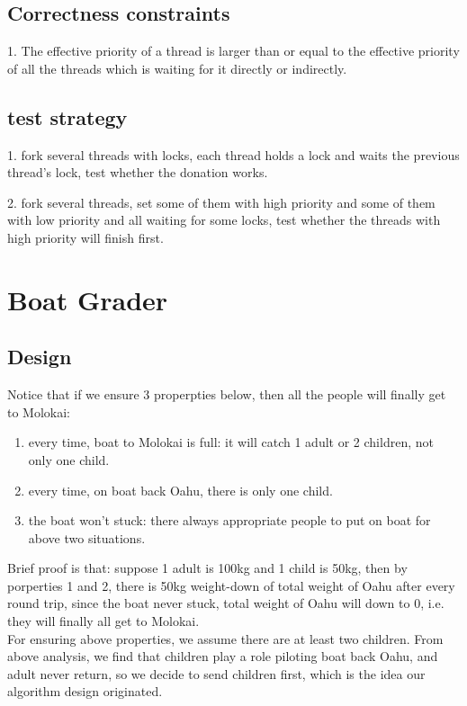 \documentclass[a4paper,10pt]{article}
\begin{document}
\subsection{Correctness constraints}

1. The effective priority of a thread is larger than or equal to the effective priority of all the threads which is waiting for it directly or indirectly.

\subsection{test strategy}

1. fork several threads with locks, each thread holds a lock and waits the previous thread's lock, test whether the donation works.

2. fork several threads, set some of them with high priority and some of them with low priority and all waiting for some locks, test whether the threads with high priority will finish first.


\section{Boat Grader}

\subsection {Design}
Notice that if we ensure 3 properpties below, then all the people will finally get to Molokai:
\begin{enumerate}
\item every time, boat to Molokai is full: it will catch 1 adult or 2 children, not only one child.
\item every time, on boat back Oahu, there is only one child.
\item the boat won't stuck: there always appropriate people to put on boat for above two situations.
\end{enumerate}
Brief proof is that: suppose 1 adult is 100kg and 1 child is 50kg, then by porperties 1 and 2, there is 50kg weight-down of total weight of Oahu after every round trip, since the boat never stuck, total weight of Oahu will down to 0, i.e. they will finally all get to Molokai.\\
For ensuring above properties, we assume there are at least two children. From above analysis, we find that children play a role piloting boat back Oahu, and adult never return, so we decide to send children first, which is the idea our algorithm design originated.
\end{document}
